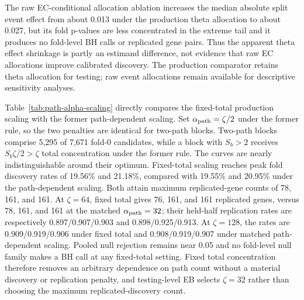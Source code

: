 \documentclass[11pt]{article}
\begin{document}
The raw EC-conditional allocation ablation increases the median absolute split event effect from about 0.013 under the production theta allocation to about 0.027, but its fold p-values are less concentrated in the extreme tail and it produces no fold-level BH calls or replicated gene pairs. Thus the apparent theta effect shrinkage is partly an estimand difference, not evidence that raw EC allocations improve calibrated discovery. The production comparator retains theta allocation for testing; raw event allocations remain available for descriptive sensitivity analyses.

Table~\ref{tab:path-alpha-scaling} directly compares the fixed-total production scaling with the former path-dependent scaling. Set \(\alpha_{\rm path}=\zeta/2\) under the former rule, so the two penalties are identical for two-path blocks. Two-path blocks comprise 5,295 of 7,671 fold-0 candidates, while a block with \(S_b>2\) receives \(S_b\zeta/2>\zeta\) total concentration under the former rule. The curves are nearly indistinguishable around their optimum. Fixed-total scaling reaches peak fold discovery rates of 19.56\% and 21.18\%, compared with 19.55\% and 20.95\% under the path-dependent scaling. Both attain maximum replicated-gene counts of 78, 161, and 161. At \(\zeta=64\), fixed total gives 76, 161, and 161 replicated genes, versus 78, 161, and 161 at the matched \(\alpha_{\rm path}=32\); their held-half replication rates are respectively 0.897/0.907/0.903 and 0.898/0.925/0.913. At \(\zeta=128\), the rates are 0.909/0.919/0.906 under fixed total and 0.908/0.919/0.907 under matched path-dependent scaling. Pooled null rejection remains near 0.05 and no fold-level null family makes a BH call at any fixed-total setting. Fixed total concentration therefore removes an arbitrary dependence on path count without a material discovery or replication penalty, and testing-level EB selects \(\zeta=32\) rather than choosing the maximum replicated-discovery count.
\end{document}
